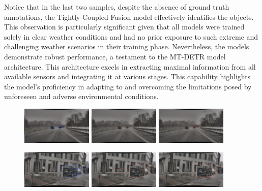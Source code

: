 \documentclass[report.tex]{subfiles}
\begin{document}
    Notice that in the last two samples, despite the absence of ground truth annotations, the Tightly-Coupled Fusion model effectively identifies the objects. This observation is particularly significant given that all models were trained solely in clear weather conditions and had no prior exposure to such extreme and challenging weather scenarios in their training phase. Nevertheless, the models demonstrate robust performance, a testament to the MT-DETR model architecture. This architecture excels in extracting maximal information from all available sensors and integrating it at various stages. This capability highlights the model's proficiency in adapting to and overcoming the limitations posed by unforeseen and adverse environmental conditions.

    
    \begin{figure}[h!]
        \centering
        \includegraphics[width=0.3\textwidth]{images/results/mtdetr/samples/day_snow/2018-02-04_12-37-52_00100_gt.png}
        \includegraphics[width=0.3\textwidth]{images/results/mtdetr/samples/day_snow/2018-02-04_12-37-52_00100_m_clr.png}
        \includegraphics[width=0.3\textwidth]{images/results/mtdetr/samples/day_snow/2018-02-04_12-37-52_00100_t_clr.png}
      
        \includegraphics[width=0.3\textwidth]{images/results/mtdetr/samples/day_snow_2/2018-02-04_11-29-58_00200_gt.png}
        \includegraphics[width=0.3\textwidth]{images/results/mtdetr/samples/day_snow_2/2018-02-04_11-29-58_00200_mid_clr.png}
        \includegraphics[width=0.3\textwidth]{images/results/mtdetr/samples/day_snow_2/2018-02-04_11-29-58_00200_tight_clr.png}
      

\end{figure}
\end{document}
